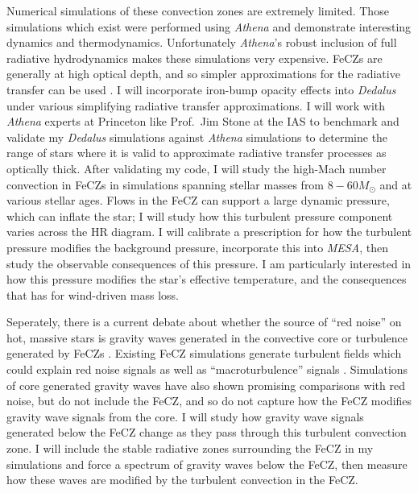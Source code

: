 \documentclass[12pt]{article}
\begin{document}
Numerical simulations of these convection zones are extremely limited.
Those simulations which exist were performed using \emph{Athena} \citep{jiang_etal_2015, schultz_etal_2020} and demonstrate interesting dynamics and thermodynamics.
Unfortunately \emph{Athena}'s robust inclusion of full radiative hydrodynamics makes these simulations very expensive.
FeCZs are generally at high optical depth, and so simpler approximations for the radiative transfer can be used \citep{jermyn_etal_2022_atlas}.
I will incorporate iron-bump opacity effects into \emph{Dedalus} under various simplifying radiative transfer approximations.
I will work with \emph{Athena} experts at Princeton like Prof.~Jim Stone at the IAS to benchmark and validate my \emph{Dedalus} simulations against \emph{Athena} simulations to determine the range of stars where it is valid to approximate radiative transfer processes as optically thick.
After validating my code, I will study the high-Mach number convection in FeCZs in simulations spanning stellar masses from $8-60 M_{\odot}$ and at various stellar ages.
Flows in the FeCZ can support a large dynamic pressure, which can inflate the star; I will study how this turbulent pressure component varies across the HR diagram.
I will calibrate a prescription for how the turbulent pressure modifies the background pressure, incorporate this into \emph{MESA}, then study the observable consequences of this pressure.
I am particularly interested in how this pressure modifies the star's effective temperature, and the consequences that has for wind-driven mass loss.

Seperately, there is a current debate about whether the source of ``red noise'' on hot, massive stars \citep{bowman_etal_2019} is gravity waves generated in the convective core or turbulence generated by FeCZs \citep{cantiello_etal_2021}.
Existing FeCZ simulations generate turbulent fields which could explain red noise signals as well as ``macroturbulence'' signals \citep{schultz_etal_2022,schultz_etal_2022b}.
Simulations of core generated gravity waves \citep{edelmann_etal_2019,horst_etal_2020} have also shown promising comparisons with red noise, but do not include the FeCZ, and so do not capture how the FeCZ modifies gravity wave signals from the core.
I will study how gravity wave signals generated below the FeCZ change as they pass through this turbulent convection zone.
I will include the stable radiative zones surrounding the FeCZ in my simulations and force a spectrum of gravity waves below the FeCZ, then measure how these waves are modified by the turbulent convection in the FeCZ.
\end{document}
